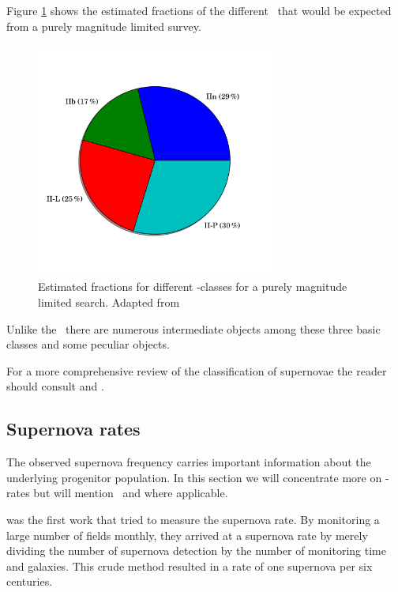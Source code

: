 Figure \ref{fig:ii_fracs} shows the estimated fractions of the different \sneii\ that would be expected from a purely magnitude limited survey.

\begin{figure}[htbp] %
   \centering
   \includegraphics[width=0.7\textwidth, trim=0 2.5cm 0 0cm]{chapter_intro/plots/plot_ii_fracs.pdf} 
   \caption{Estimated fractions for different \snii-classes for a purely magnitude limited search. Adapted from \citet{2011MNRAS.412.1441L}}
   \label{fig:ii_fracs}
\end{figure}


Unlike the \sneia\ there are numerous intermediate objects among these three basic classes and some peculiar objects.


For a more comprehensive review of the classification of supernovae the reader should consult \citet{2003LNP...598...21T} and \citet{2007AIPC..937..187T}.

\subsection{Supernova rates}
\label{sec:sn_rates}
The observed supernova frequency carries important information about the underlying progenitor population. In this section we will concentrate more on \sneia-rates but will mention \sneii\ and \sneibc where applicable.

\citet{1938ApJ....88..529Z} was the first work that tried to measure the supernova rate. By monitoring a large number of fields monthly, they arrived at a supernova rate by merely dividing the number of supernova detection by the number of monitoring time and galaxies. This crude method resulted in a rate of one supernova per six centuries. 

